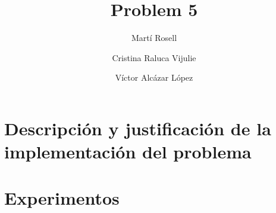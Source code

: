 

\title{Problem 5}
\author{
  Martí Rosell \and
  Cristina Raluca Vijulie \and
  Víctor Alcázar López 
}


\maketitle
\tableofcontents

\section{Descripción y justificación de la implementación del problema}






\section{Experimentos}












